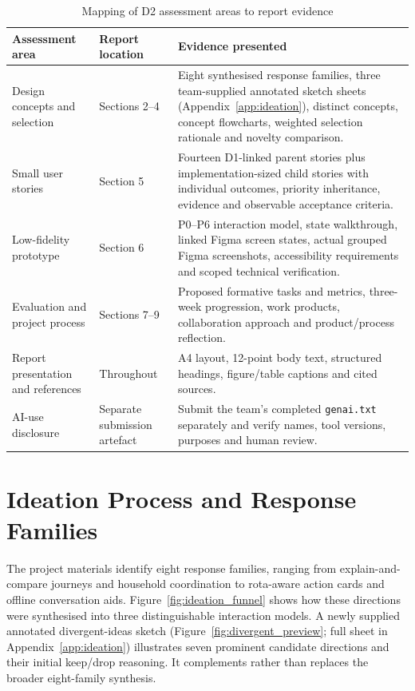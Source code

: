 \documentclass[12pt,a4paper]{article}
\newcommand{\code}[1]{\texttt{#1}}
\begin{document}
\begin{table}[H]
\centering
\small
\caption{Mapping of D2 assessment areas to report evidence}
\label{tab:assessment-map}
\begin{tabularx}{\textwidth}{@{}>{\raggedright\arraybackslash}p{3.1cm}>{\raggedright\arraybackslash}p{2.6cm}X@{}}
\toprule
\textbf{Assessment area} & \textbf{Report location} & \textbf{Evidence presented}\\
\midrule
Design concepts and selection & Sections 2--4 & Eight synthesised response families, three team-supplied annotated sketch sheets (Appendix~\ref{app:ideation}), distinct concepts, concept flowcharts, weighted selection rationale and novelty comparison.\\
\rowcolor{RowGray}
Small user stories & Section 5 & Fourteen D1-linked parent stories plus implementation-sized child stories with individual outcomes, priority inheritance, evidence and observable acceptance criteria.\\
Low-fidelity prototype & Section 6 & P0--P6 interaction model, state walkthrough, linked Figma screen states, actual grouped Figma screenshots, accessibility requirements and scoped technical verification.\\
\rowcolor{RowGray}
Evaluation and project process & Sections 7--9 & Proposed formative tasks and metrics, three-week progression, work products, collaboration approach and product/process reflection.\\
Report presentation and references & Throughout & A4 layout, 12-point body text, structured headings, figure/table captions and cited sources.\\
\rowcolor{RowGray}
AI-use disclosure & Separate submission artefact & Submit the team's completed \code{genai.txt} separately and verify names, tool versions, purposes and human review.\\
\bottomrule
\end{tabularx}
\end{table}

\section{Ideation Process and Response Families}

The project materials identify eight response families, ranging from explain-and-compare journeys and household coordination to rota-aware action cards and offline conversation aids. Figure~\ref{fig:ideation_funnel} shows how these directions were synthesised into three distinguishable interaction models. A newly supplied annotated divergent-ideas sketch (Figure~\ref{fig:divergent_preview}; full sheet in Appendix~\ref{app:ideation}) illustrates seven prominent candidate directions and their initial keep/drop reasoning. It complements rather than replaces the broader eight-family synthesis.
\end{document}
